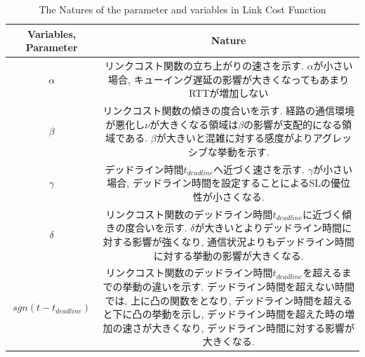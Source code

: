 \begin{table}[t]
    \begin{center}
    \caption{The Natures of the parameter and variables in Link Cost Function}
    \begin{tabular}{|c|c|}
    \hline
    Variables, Parameter & Nature \\ \hline \hline
    $\alpha$ & \parbox{25zw}{リンクコスト関数の立ち上がりの速さを示す. $\alpha$が小さい場合,
    キューイング遅延の影響が大きくなってもあまりRTTが増加しない }\\ \hline
    $\beta$ & \parbox{25zw}{リンクコスト関数の傾きの度合いを示す.
    経路の通信環境が悪化し$\nu$が大きくなる領域は$\beta$の影響が支配的になる領域である.
    $\beta$が大きいと混雑に対する感度がよりアグレッシブな挙動を示す. } \\ \hline
    $\gamma$ & \parbox{25zw}{デッドライン時間$t_{deadline}$へ近づく速さを示す. $\gamma$が小さい場合,
    デッドライン時間を設定することによるSLの優位性が小さくなる. }\\ \hline
    $\delta$ &
    \parbox{25zw}{リンクコスト関数のデッドライン時間$t_{deadline}$に近づく傾きの度合いを示す.
    $\delta$が大きいとよりデッドライン時間に対する影響が強くなり, 通信状況よりもデッドライン時間に対する挙動の影響が大きくなる.　} \\ \hline
    $sgn(t-t_{deadline})$ &
    \parbox{25zw}{リンクコスト関数のデッドライン時間$t_{deadline}$を超えるまでの挙動の違いを示す. デッドライン時間を超えない時間では,
    上に凸の関数をとなり, デッドライン時間を超えると下に凸の挙動を示し, デッドライン時間を超えた時の増加の速さが大きくなり,
    デッドライン時間に対する影響が大きくなる. }
    \\
    \hline
    \end{tabular}
    \label{table:link_cost_nature}
    \end{center}
\end{table}



